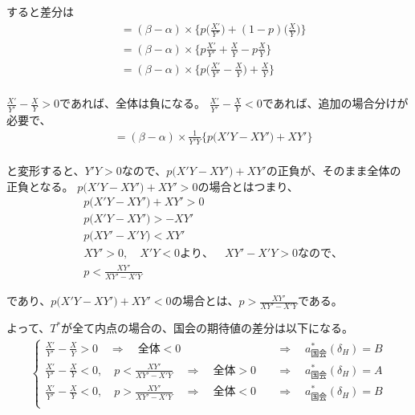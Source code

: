 \documentclass[main.tex]{subfiles}
\begin{document}
すると差分は
\begin{align*}
    &= (\beta - \alpha) × \Big\{  p \Big( \frac{X'}{Y'} \Big) +(1-p) \Big(  \frac{X}{Y} \Big) \Big\}\\[1em]
    &= (\beta - \alpha) × \Big\{  p \frac{X'}{Y'}  + \frac{X}{Y} -p \frac{X}{Y}  \Big\}\\[1em]
    &= (\beta - \alpha) × \Big\{  p \Big( \frac{X'}{Y'} - \frac{X}{Y} \Big) + \frac{X}{Y}   \Big\}\\[1em]
\end{align*}

$\frac{X'}{Y'} - \frac{X}{Y} > 0$であれば、全体は負になる。
$\frac{X'}{Y'} - \frac{X}{Y} < 0$であれば、追加の場合分けが必要で、
\begin{align*}
    &= (\beta - \alpha) × \frac{1}{Y'Y} \Big\{  p \Big( X'Y - XY' \Big) + XY'   \Big\}\\[1em]
\end{align*}

と変形すると、$Y'Y>0$なので、$ p \Big( X'Y - XY' \Big) + XY'$の正負が、そのまま全体の正負となる。
$p \Big( X'Y - XY' \Big) + XY'>0$の場合とはつまり、
\begin{align*}
    & p \Big( X'Y - XY' \Big) + XY' > 0\\
    & p \Big( X'Y - XY' \Big)  > -  XY'\\
    & p \Big(XY' - X'Y  \Big)  <  XY'\\[0.5em]
    & XY'>0,\quad X'Y<0より、\quad XY' - X'Y>0なので、\\[1em]
    & p   <  \frac{XY'}{XY' - X'Y}
\end{align*}

であり、$p \Big( X'Y - XY' \Big) + XY'<0$の場合とは、$p   >  \frac{XY'}{XY' - X'Y}$である。


よって、$T^*$が全て内点の場合の、国会の期待値の差分は以下になる。
\begin{align*}
    \begin{cases}
        \frac{X'}{Y'} - \frac{X}{Y} > 0 \quad\Rightarrow\quad 全体<0 &\quad\Rightarrow\quad a^*_{国会}(\delta_H) = B\\[0.5em]
        \frac{X'}{Y'} - \frac{X}{Y} < 0,\quad p < \frac{XY'}{XY' - X'Y} \quad\Rightarrow\quad 全体>0 &\quad\Rightarrow\quad a^*_{国会}(\delta_H) = A\\[0.5em]
        \frac{X'}{Y'} - \frac{X}{Y} < 0,\quad p > \frac{XY'}{XY' - X'Y} \quad\Rightarrow\quad 全体<0 &\quad\Rightarrow\quad a^*_{国会}(\delta_H) = B\\[0.5em] 
     \end{cases}
\end{align*}
\end{document}
